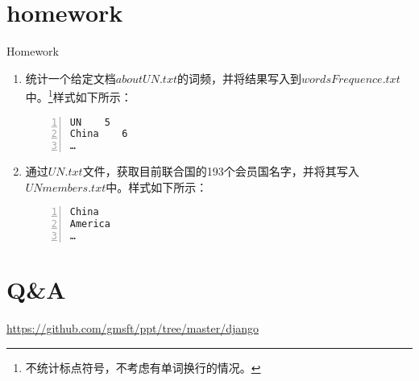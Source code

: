 \documentclass{beamer}
\begin{document}
\section{homework}
\begin{frame}[fragile]{Homework}

\begin{enumerate}
\item
统计一个给定文档$aboutUN.txt$的词频，并将结果写入到$wordsFrequence.txt$中。\footnote{不统计标点符号，不考虑有单词换行的情况。}样式如下所示：
\begin{Verbatim}[numbers=left,frame=single,rulecolor=\color{red}]
UN    5
China    6
…
\end{Verbatim}
\item
通过$UN.txt$文件，获取目前联合国的193个会员国名字，并将其写入$UNmembers.txt$中。样式如下所示：
\begin{Verbatim}[numbers=left,frame=single,rulecolor=\color{red}]
China
America
…
\end{Verbatim}
\end{enumerate}
\end{frame}
\section{Q\&A}
\begin{frame}
\url{https://github.com/gmsft/ppt/tree/master/django}
\end{frame}


%
\end{document}
